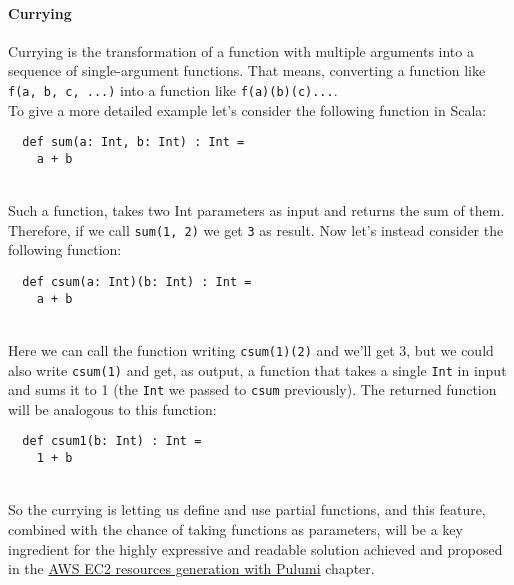 \paragraph{Currying}
Currying is the transformation of a function with multiple arguments into a sequence of single-argument functions. That means, converting a function like \texttt{f(a, b, c, ...)} into a function like \texttt{f(a)(b)(c)...}.\\
To give a more detailed example let's consider the following function in Scala:
\begin{verbatim}
  def sum(a: Int, b: Int) : Int = 
    a + b
\end{verbatim}\mbox{}\\
Such a function, takes two Int parameters as input and returns the sum of them.
Therefore, if we call \texttt{sum(1, 2)} we get \texttt{3} as result.
Now let's instead consider the following function:
\begin{verbatim}
  def csum(a: Int)(b: Int) : Int = 
    a + b
\end{verbatim}\mbox{}\\
Here we can call the function writing \texttt{csum(1)(2)} and we'll get 3, but we could also write \texttt{csum(1)} and get, as output, a function that takes a single \texttt{Int} in input and sums it to 1 (the \texttt{Int} we passed to \texttt{csum} previously).
The returned function will be analogous to this function:
\begin{verbatim}
  def csum1(b: Int) : Int = 
    1 + b
\end{verbatim}\mbox{}\\
So the currying is letting us define and use partial functions, and this feature, combined with the chance of taking functions as parameters, will be a key ingredient for the highly expressive and readable solution achieved and proposed in the \hyperref[cap:case-study]{AWS EC2 resources generation with Pulumi} chapter.

